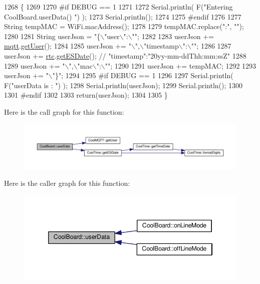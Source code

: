 \begin{DoxyCode}
1268 \{
1269 
1270 \textcolor{preprocessor}{#if DEBUG == 1}
1271 
1272     Serial.println( F(\textcolor{stringliteral}{"Entering CoolBoard.userData() "}) );
1273     Serial.println();
1274 
1275 \textcolor{preprocessor}{#endif}
1276 
1277     String tempMAC = WiFi.macAddress();
1278 
1279     tempMAC.replace(\textcolor{stringliteral}{":"}, \textcolor{stringliteral}{""});
1280 
1281     String userJson = \textcolor{stringliteral}{"\{\(\backslash\)"user\(\backslash\)":\(\backslash\)""};
1282 
1283     userJson += \hyperlink{class_cool_board_a2399f44d7c23c1149a335cb3b46d90f1}{mqtt}.\hyperlink{class_cool_m_q_t_t_a373cc92fca7760d886f02d8a6e5b3f63}{getUser}();
1284 
1285     userJson += \textcolor{stringliteral}{"\(\backslash\)",\(\backslash\)"timestamp\(\backslash\)":\(\backslash\)""};
1286 
1287     userJson += \hyperlink{class_cool_board_a50d2a6716879d64a85f3c6b44ad63275}{rtc}.\hyperlink{class_cool_time_ac4f32ee513c1328d984306645e8785a4}{getESDate}(); \textcolor{comment}{// "timestamp":"20yy-mm-ddThh:mm:ssZ"}
1288 
1289     userJson += \textcolor{stringliteral}{"\(\backslash\)",\(\backslash\)"mac\(\backslash\)":\(\backslash\)""};
1290 
1291     userJson += tempMAC;
1292 
1293     userJson += \textcolor{stringliteral}{"\(\backslash\)"\}"};
1294 
1295 \textcolor{preprocessor}{#if DEBUG == 1}
1296 
1297     Serial.println( F(\textcolor{stringliteral}{"userData is : "}) );
1298     Serial.println(userJson);
1299     Serial.println();
1300 
1301 \textcolor{preprocessor}{#endif  }
1302     
1303     \textcolor{keywordflow}{return}(userJson);
1304     
1305 \}
\end{DoxyCode}
Here is the call graph for this function\+:\nopagebreak
\begin{figure}[H]
\begin{center}
\leavevmode
\includegraphics[width=350pt]{d7/df9/class_cool_board_ae7358fb6e623cfc81b775f5f1734909b_cgraph}
\end{center}
\end{figure}
Here is the caller graph for this function\+:\nopagebreak
\begin{figure}[H]
\begin{center}
\leavevmode
\includegraphics[width=346pt]{d7/df9/class_cool_board_ae7358fb6e623cfc81b775f5f1734909b_icgraph}
\end{center}
\end{figure}



